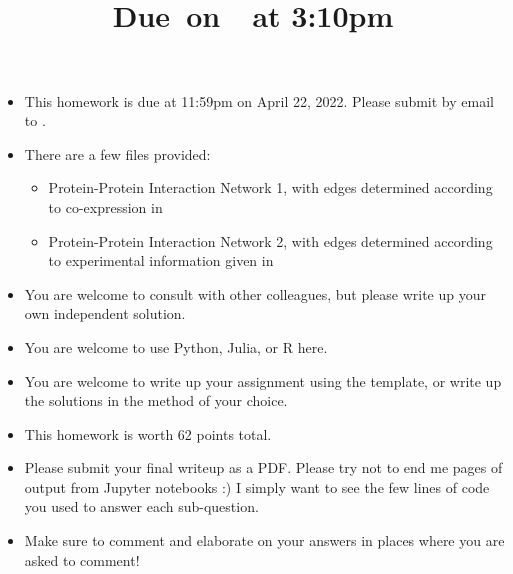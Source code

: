 \documentclass{article}
\title{
    \vspace{2in}
    \textmd{\textbf{\hmwkClass\hmwkTitle}}\\
    \normalsize\vspace{0.1in}\small{Due\ on\ \hmwkDueDate\ at 3:10pm}\\
    \vspace{3in}
}
\author{\hmwkAuthorName}
\date{}
\begin{document}

\begin{itemize}
\item This homework is due at 11:59pm on April 22, 2022. Please submit by email to . 
\item There are a few files provided:
\begin{itemize}
\item Protein-Protein Interaction Network 1, with edges determined according to co-expression in 
\item Protein-Protein Interaction Network 2, with edges determined according to experimental information given in 
\end{itemize}
\item You are welcome to consult with other colleagues, but please write up your own independent solution. 
\item You are welcome to use Python, Julia, or R here.
\item You are welcome to write up your assignment using the  template, or write up the solutions in the method of your choice. 
\item This homework is worth 62 points total. 
\item Please submit your final writeup as a PDF. Please try not to end me pages of output from Jupyter notebooks :) I simply want to see the few lines of code you used to answer each sub-question.
\item Make sure to comment and elaborate on your answers in places where you are asked to comment! 
\end{itemize}
\end{document}
